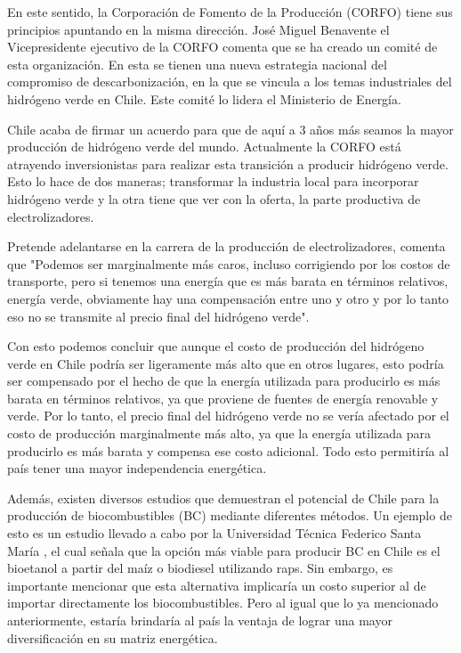 En este sentido, la Corporación de Fomento de la Producción (CORFO) tiene sus principios apuntando en la misma dirección. José Miguel Benavente el Vicepresidente ejecutivo de la CORFO comenta que se ha creado un comité de esta organización. En esta se tienen una nueva estrategia nacional del compromiso de descarbonización, en la que se vincula a los temas industriales del hidrógeno verde en Chile. Este comité lo lidera el Ministerio de Energía.
\vspace{2.5mm}

Chile acaba de firmar un acuerdo para que de aquí a 3 años más seamos la mayor producción de hidrógeno verde del mundo. Actualmente la CORFO está atrayendo inversionistas para realizar esta transición a producir hidrógeno verde. Esto lo hace de dos maneras; transformar la industria local para incorporar hidrógeno verde y la otra tiene que ver con la oferta, la parte productiva de electrolizadores.
\vspace{2.5mm}

Pretende adelantarse en la carrera de la producción de electrolizadores, comenta que "Podemos ser marginalmente más caros, incluso corrigiendo por los costos de transporte, pero si tenemos una energía que es más barata en términos relativos, energía verde, obviamente hay una compensación entre uno y otro y por lo tanto eso no se transmite al precio final del hidrógeno verde".
\vspace{2.5mm}

Con esto podemos concluir que aunque el costo de producción del hidrógeno verde en Chile podría ser ligeramente más alto que en otros lugares, esto podría ser compensado por el hecho de que la energía utilizada para producirlo es más barata en términos relativos, ya que proviene de fuentes de energía renovable y verde. Por lo tanto, el precio final del hidrógeno verde no se vería afectado por el costo de producción marginalmente más alto, ya que la energía utilizada para producirlo es más barata y compensa ese costo adicional. Todo esto permitiría al país tener una mayor independencia energética.
\vspace{2.5mm}

Además, existen diversos estudios que demuestran el potencial de Chile para la producción de biocombustibles (BC) mediante diferentes métodos. Un ejemplo de esto es un estudio llevado a cabo por la Universidad Técnica Federico Santa María , el cual señala que la opción más viable para producir BC en Chile es el bioetanol a partir del maíz o biodiesel utilizando raps. Sin embargo, es importante mencionar que esta alternativa implicaría un costo superior al de importar directamente los biocombustibles. Pero al igual que lo ya mencionado anteriormente, estaría brindaría al país la ventaja de lograr una mayor diversificación en su matriz energética.
\vspace{2.5mm}


